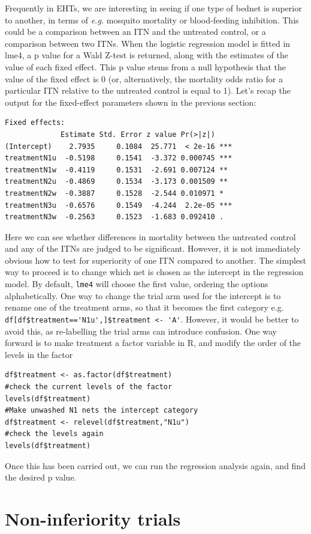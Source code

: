 \documentclass[11pt]{article}
\begin{document}
Frequently in EHTs, we are interesting in seeing if one type of bednet is superior to another, in terms of \textit{e.g.} mosquito mortality or blood-feeding inhibition. This could be a comparison between an ITN and the untreated control, or a comparison between two ITNs. When the logistic regression model is fitted in lme4, a p value for a Wald Z-test is returned, along with the estimates of the value of each fixed effect. This p value stems from a null hypothesis that the value of the fixed effect is 0 (or, alternatively, the mortality odds ratio for a particular ITN relative to the untreated control is equal to 1). Let's recap the output for the fixed-effect parameters shown in the previous section:
\begin{verbatim}
Fixed effects:
             Estimate Std. Error z value Pr(>|z|)    
(Intercept)    2.7935     0.1084  25.771  < 2e-16 ***
treatmentN1u  -0.5198     0.1541  -3.372 0.000745 ***
treatmentN1w  -0.4119     0.1531  -2.691 0.007124 ** 
treatmentN2u  -0.4869     0.1534  -3.173 0.001509 ** 
treatmentN2w  -0.3887     0.1528  -2.544 0.010971 *  
treatmentN3u  -0.6576     0.1549  -4.244  2.2e-05 ***
treatmentN3w  -0.2563     0.1523  -1.683 0.092410 .  
\end{verbatim}
Here we can see whether differences in mortality between the untreated control and any of the ITNs are judged to be significant. However, it is not immediately obvious how to test for superiority of one ITN compared to another. The simplest way to proceed is to change which net is chosen as the intercept in the regression model. By default, \verb+lme4+ will choose the first value, ordering the options alphabetically. One way to change the trial arm used for the intercept is to rename one of the treatment arms, so that it becomes the first category e.g. \verb+df[df$treatment=='N1u',]$treatment <- 'A'+. However, it would be better to avoid this, as re-labelling the trial arms can introduce confusion. One way forward is to make treatment a factor variable in R, and modify the order of the levels in the factor 
\begin{verbatim}
df$treatment <- as.factor(df$treatment)
#check the current levels of the factor
levels(df$treatment)
#Make unwashed N1 nets the intercept category
df$treatment <- relevel(df$treatment,"N1u") 
#check the levels again
levels(df$treatment)
\end{verbatim}
Once this has been carried out, we can run the regression analysis again, and find the desired p value.


\section{Non-inferiority trials}
\end{document}
